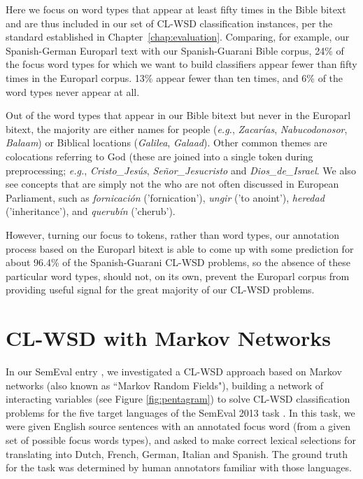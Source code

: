 Here we focus on word types that appear at least fifty times in the Bible
bitext and are thus included in our set of CL-WSD classification instances,
per the standard established in Chapter~\ref{chap:evaluation}.
Comparing, for example, our Spanish-German Europarl text with our
Spanish-Guarani Bible corpus, 24\% of the focus word types for which we want to
build classifiers appear fewer than fifty times in the Europarl corpus. 13\%
appear fewer than ten times, and 6\% of the word types never appear at all.

Out of the word types that appear in our Bible bitext but never in the Europarl
bitext, the majority are either names for people (\emph{e.g.}, \emph{Zacarías},
\emph{Nabucodonosor}, \emph{Balaam}) or Biblical locations (\emph{Galilea},
\emph{Galaad}). Other common themes are colocations referring to God (these are
joined into a single token during preprocessing; \emph{e.g.},
\emph{Cristo\_Jesús}, \emph{Señor\_Jesucristo} and \emph{Dios\_de\_Israel}. We
also see concepts that are simply not the who are not often discussed in
European Parliament, such as \emph{fornicación} ('fornication'), \emph{ungir}
('to anoint'), \emph{heredad} ('inheritance'), and \emph{querubín}
('cherub').

However, turning our focus to tokens, rather than word types, our annotation
process based on the Europarl bitext is able to come up with some prediction
for about 96.4\% of the Spanish-Guarani CL-WSD problems, so the absence of
these particular word types, should not, on its own, prevent the Europarl
corpus from providing useful signal for the great majority of our CL-WSD
problems.




\section{CL-WSD with Markov Networks}
\label{sec:multilingual-mrf}
In our SemEval entry \cite{rudnick-liu-gasser:2013:SemEval-2013}, we
investigated a CL-WSD approach based on Markov networks (also known as ``Markov
Random Fields"), building a network of interacting variables (see Figure
\ref{fig:pentagram}) to solve CL-WSD classification problems for the five
target languages of the SemEval 2013 task \cite{task10}. In this task, we were
given English source sentences with an annotated focus word (from a given set
of possible focus words types), and asked to make correct lexical selections
for translating into Dutch, French, German, Italian and Spanish. The ground
truth for the task was determined by human annotators familiar with those
languages.

